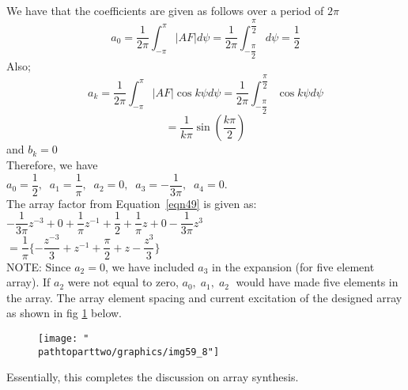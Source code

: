 \begin{exmp}
We have that the coefficients are given as follows over a period of $2\pi$
$$a_0 = \dfrac{1}{2\pi}\int_{-\pi}^{\pi}|AF|d\psi = \dfrac{1}{2\pi}\int_{-\dfrac{\pi}{2}}^{\dfrac{\pi}{2}}d\psi = \frac{1}{2}$$
Also;
$$a_k = \dfrac{1}{2\pi}\int_{-\pi}^{\pi}|AF|\cos k\psi d\psi = \dfrac{1}{2\pi}\int_{-\dfrac{\pi}{2}}^{\dfrac{\pi}{2}}\cos k\psi d\psi$$
$$= \dfrac{1}{k\pi}\sin(\dfrac{k\pi}{2})$$ and $b_k = 0$\\
Therefore, we have\\
$ a_0 = \dfrac{1}{2}, \; \; a_1 = \dfrac{1}{\pi},\; \; a_2 = 0, \; \; a_3 = -\dfrac{1}{3\pi}, \; \;a_4 = 0$.\\
The array factor from Equation~\ref{eqn49} is given as:\\
$-\dfrac{1}{3\pi}z^{-3} + 0 +\dfrac{1}{\pi}z^{-1} + \dfrac{1}{2} + \dfrac{1}{\pi}z + 0 - \dfrac{1}{3\pi}z^{3}$\\
$= \dfrac{1}{\pi}\{
-\dfrac{z^{-3}}{3} + z^{-1} + \dfrac{\pi}{2} + z - \dfrac{z^3}{3}
\}$\\
NOTE: Since $a_2 = 0$, we have included $a_3$ in the expansion (for five element array). If $a_2$ were not equal to zero, $a_0, \; a_1, \; a_2 \;$ would have made five elements in the array. The array element spacing and current excitation of the designed array as shown in fig \ref{fig:fig-7} below.
\begin{figure}[h]
\centering
\texttt{[image: "\\pathtoparttwo/graphics/img59\_8"]}
\caption{}
\label{fig:fig-7}
\end{figure}

\end{exmp}
\begin{ExerciseList}
\Exercise[title=DIY]
\end{ExerciseList}

Essentially, this completes the discussion on array synthesis.